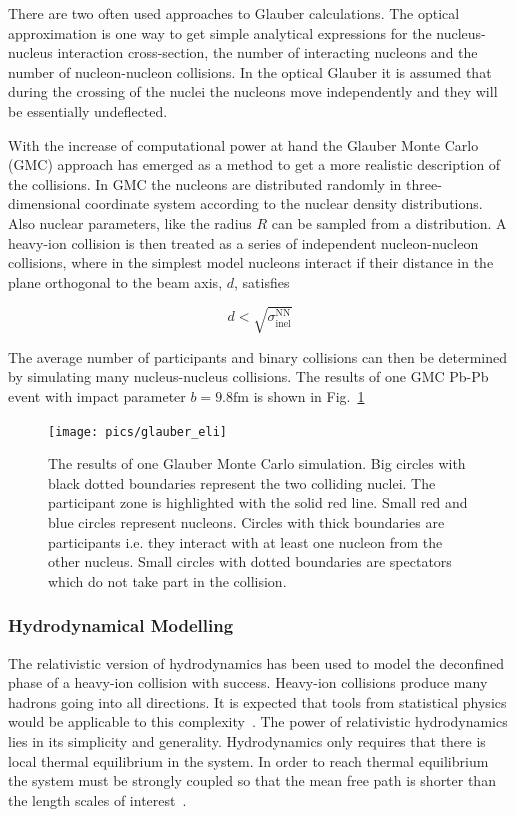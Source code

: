 There are two often used approaches to Glauber calculations. The optical approximation is one way to get simple analytical expressions for the nucleus-nucleus interaction cross-section, the number of interacting  nucleons and the number of nucleon-nucleon collisions. In the optical Glauber it is assumed that during the crossing of the nuclei the nucleons move independently and they will be essentially undeflected.  

With the increase of computational power at hand the Glauber Monte Carlo (GMC) approach has emerged as a method to get a more realistic description of the collisions. In GMC the nucleons are distributed randomly in three-dimensional coordinate system according to the nuclear density distributions. Also nuclear parameters, like the radius $R$ can be sampled from a distribution. A heavy-ion collision is then treated as a series of independent nucleon-nucleon collisions, where in the simplest model nucleons interact if their distance  in the plane orthogonal to the beam axis, $d$, satisfies

\begin{equation}
d< \sqrt{\sigma\mathrm{^{NN}_{inel}}}
\end{equation}

\noindent The average number of participants and binary collisions can then be determined by simulating many nucleus-nucleus collisions. The results of one GMC Pb-Pb event with impact parameter $b=9.8\mathrm{fm}$ is shown in Fig.~\ref{fig:GMC}

\begin{figure}[htbp]
\centering
               \texttt{[image: pics/glauber\_eli]}
        \caption[The results of one Glauber Monte Carlo simulation.]{The results of one Glauber Monte Carlo simulation. Big circles with black dotted boundaries represent the two colliding nuclei. The participant zone is highlighted with the solid red line.        
        Small red and blue circles represent nucleons. Circles with thick boundaries are participants i.e. they interact with at least one nucleon from the other nucleus. Small circles with dotted boundaries are spectators which do not take part in the collision.}
        	\label{fig:GMC}
\end{figure}



\subsubsection{Hydrodynamical Modelling}
\label{sec:hydro}
The relativistic version of hydrodynamics has been used to model the deconfined phase of a heavy-ion collision with success. Heavy-ion collisions produce many hadrons going into all directions. It is expected that tools from statistical physics would be applicable to this complexity~\cite{Ollitrault:2007du}. The power of relativistic hydrodynamics lies in its simplicity and generality. Hydrodynamics only requires that there is local thermal equilibrium in the system. In order to reach thermal equilibrium the system must be strongly coupled so that the mean free path is shorter than the length scales of interest~\cite{Romatschke:2009im}.


